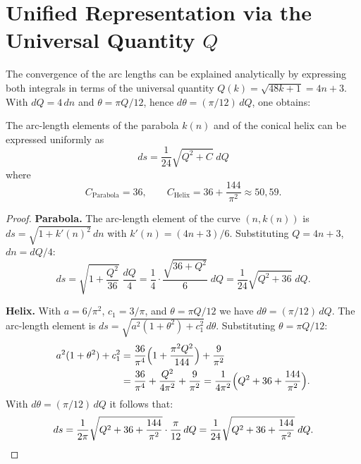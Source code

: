 \section{Unified Representation via the Universal Quantity \texorpdfstring{$Q$}{Q}}

The convergence of the arc lengths can be explained analytically by
expressing both integrals in terms of the universal quantity
$Q(k) = \sqrt{48k+1} = 4n+3$. With $dQ = 4\,dn$ and
$\theta = \pi Q/12$, hence $d\theta = (\pi/12)\,dQ$, one obtains:

\begin{theorem}\label{thm:q-arc-length}
The arc-length elements of the parabola $k(n)$ and of the conical helix
can be expressed uniformly as
\begin{equation}\label{eq:ds-uniform}
  ds = \frac{1}{24}\sqrt{Q^2 + C}\; dQ
\end{equation}
where
\[
  C_{\mathrm{Parabola}} = 36,
  \qquad
  C_{\mathrm{Helix}} = 36 + \frac{144}{\pi^2} \approx 50{,}59.
\]
\end{theorem}

\begin{proof}
\textbf{Parabola.}\; The arc-length element of the curve $(n, k(n))$ is
$ds = \sqrt{1 + k'(n)^2}\,dn$ with $k'(n) = (4n+3)/6$.
Substituting $Q = 4n+3$, $dn = dQ/4$:
\[
  ds = \sqrt{1 + \frac{Q^2}{36}}\;\frac{dQ}{4}
     = \frac{1}{4}\cdot\frac{\sqrt{36 + Q^2}}{6}\;dQ
     = \frac{1}{24}\sqrt{Q^2 + 36}\;dQ.
\]

\textbf{Helix.}\; With $a = 6/\pi^2$, $c_1 = 3/\pi$, and
$\theta = \pi Q/12$ we have $d\theta = (\pi/12)\,dQ$. The arc-length
element is $ds = \sqrt{a^2(1+\theta^2) + c_1^2}\,d\theta$. Substituting
$\theta = \pi Q/12$:
\begin{align*}
  a^2(1+\theta^2) + c_1^2
  &= \frac{36}{\pi^4}\Bigl(1 + \frac{\pi^2 Q^2}{144}\Bigr) + \frac{9}{\pi^2}\\
  &= \frac{36}{\pi^4} + \frac{Q^2}{4\pi^2} + \frac{9}{\pi^2}
   = \frac{1}{4\pi^2}\Bigl(Q^2 + 36 + \frac{144}{\pi^2}\Bigr).
\end{align*}
With $d\theta = (\pi/12)\,dQ$ it follows that:
\[
  ds = \frac{1}{2\pi}\sqrt{Q^2 + 36 + \frac{144}{\pi^2}}
       \cdot \frac{\pi}{12}\,dQ
     = \frac{1}{24}\sqrt{Q^2 + 36 + \frac{144}{\pi^2}}\;dQ.
     \qedhere
\]
\end{proof}

